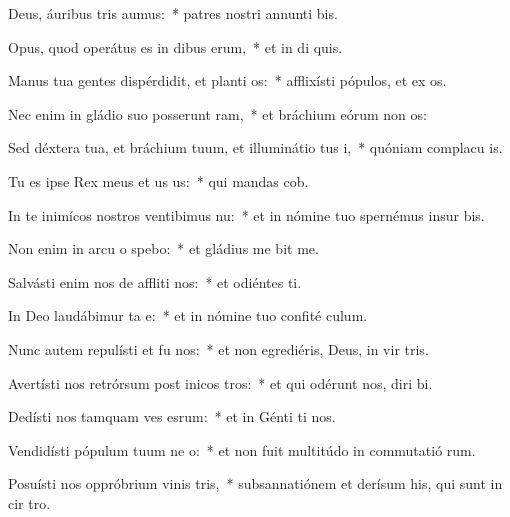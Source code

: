 \item Deus, áuribus tris aumus:~* patres nostri annunti bis.
\item Opus, quod operátus es in dibus erum,~* et in di quis.
\item Manus tua gentes dispérdidit, et planti os:~* afflixísti pópulos, et ex os.
\item Nec enim in gládio suo posserunt ram,~* et bráchium eórum non  os:
\item Sed déxtera tua, et bráchium tuum, et illuminátio tus i,~* quóniam complacu  is.
\item Tu es ipse Rex meus et us us:~* qui mandas  cob.
\item In te inimícos nostros ventibimus nu:~* et in nómine tuo spernémus insur  bis.
\item Non enim in arcu o spebo:~* et gládius me  bit me.
\item Salvásti enim nos de affliti nos:~* et odiéntes  ti.
\item In Deo laudábimur ta e:~* et in nómine tuo confité  culum.
\item Nunc autem repulísti et fu nos:~* et non egrediéris, Deus, in vir tris.
\item Avertísti nos retrórsum post inicos tros:~* et qui odérunt nos, diri bi.
\item Dedísti nos tamquam ves esrum:~* et in Génti ti nos.
\item Vendidísti pópulum tuum ne o:~* et non fuit multitúdo in commutatió rum.
\item Posuísti nos oppróbrium vinis tris,~* subsannatiónem et derísum his, qui sunt in cir tro.
